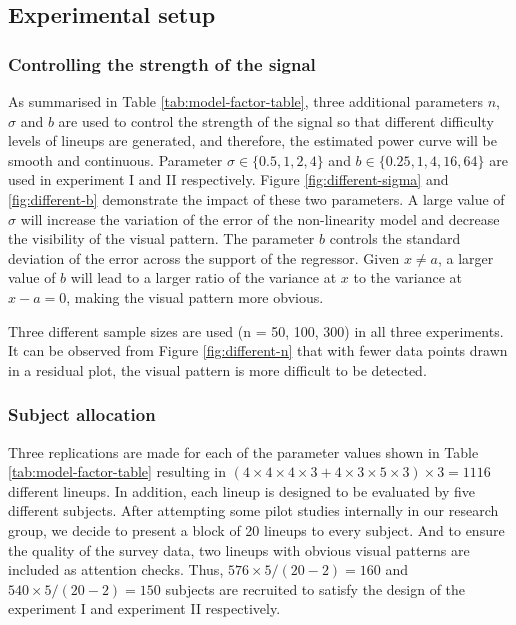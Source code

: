 \documentclass[]{interact}
\theoremstyle{plain}%
\theoremstyle{definition}
\theoremstyle{remark}
\begin{document}
\hypertarget{experimental-setup}{%
\subsection{Experimental setup}\label{experimental-setup}}

\hypertarget{controlling-the-strength-of-the-signal}{%
\subsubsection{Controlling the strength of the
signal}\label{controlling-the-strength-of-the-signal}}

As summarised in Table \ref{tab:model-factor-table}, three additional
parameters \(n\), \(\sigma\) and \(b\) are used to control the strength
of the signal so that different difficulty levels of lineups are
generated, and therefore, the estimated power curve will be smooth and
continuous. Parameter \(\sigma \in \{0.5, 1, 2, 4\}\) and
\(b \in \{0.25, 1, 4, 16, 64\}\) are used in experiment I and II
respectively. Figure \ref{fig:different-sigma} and \ref{fig:different-b}
demonstrate the impact of these two parameters. A large value of
\(\sigma\) will increase the variation of the error of the non-linearity
model and decrease the visibility of the visual pattern. The parameter
\(b\) controls the standard deviation of the error across the support of
the regressor. Given \(x \neq a\), a larger value of \(b\) will lead to
a larger ratio of the variance at \(x\) to the variance at
\(x - a = 0\), making the visual pattern more obvious.

Three different sample sizes are used (n = 50, 100, 300) in all three
experiments. It can be observed from Figure \ref{fig:different-n} that
with fewer data points drawn in a residual plot, the visual pattern is
more difficult to be detected.

\hypertarget{subject-allocation}{%
\subsubsection{Subject allocation}\label{subject-allocation}}

Three replications are made for each of the parameter values shown in
Table \ref{tab:model-factor-table} resulting in
\((4 \times 4 \times 4 \times 3 + 4 \times 3 \times 5 \times 3) \times 3 = 1116\)
different lineups. In addition, each lineup is designed to be evaluated
by five different subjects. After attempting some pilot studies
internally in our research group, we decide to present a block of 20
lineups to every subject. And to ensure the quality of the survey data,
two lineups with obvious visual patterns are included as attention
checks. Thus, \(576 \times 5 / (20-2) = 160\) and
\(540 \times 5 / (20-2) = 150\) subjects are recruited to satisfy the
design of the experiment I and experiment II respectively.
\end{document}

